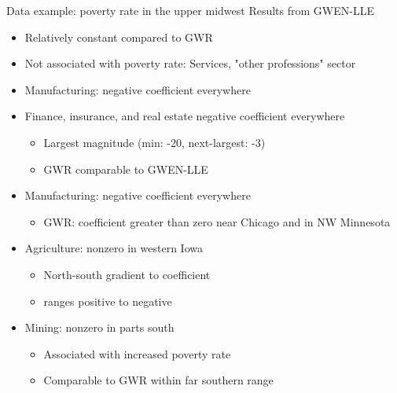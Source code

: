 \documentclass[12pt,t]{beamer}
\newcommand{\subt}[1]{{\footnotesize \color{subtitle} {#1}}}
\begin{document}
\begin{frame}{Data example: poverty rate in the upper midwest}
\subt{Results from GWEN-LLE}

\begin{itemize}
  \item Relatively constant compared to GWR
  \item Not associated with poverty rate: Services, "other professions" sector
  \item Manufacturing: negative coefficient everywhere
  \item Finance, insurance, and real estate negative coefficient everywhere
  \begin{itemize}
    \item Largest magnitude (min: -20, next-largest: -3)
    \item GWR comparable to GWEN-LLE
  \end{itemize}

  \item Manufacturing: negative coefficient everywhere
  \begin{itemize}
    \item GWR: coefficient greater than zero near Chicago and in NW Minnesota
  \end{itemize}

  \item Agriculture: nonzero in western Iowa
  \begin{itemize}
    \item North-south gradient to coefficient
    \item ranges positive to negative
  \end{itemize}

  \item Mining: nonzero in parts south 
  \begin{itemize}
    \item Associated with increased poverty rate
    \item Comparable to GWR within far southern range
  \end{itemize}
\end{itemize}

\end{frame}
\end{document}
